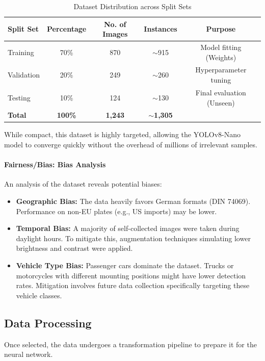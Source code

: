\begin{table}[htbp]
	\centering
	\caption{Dataset Distribution across Split Sets}
	\label{tab:dataset_split}
	\begin{tabular}{@{}lcccc@{}}
		\toprule
		\textbf{Split Set} & \textbf{Percentage} & \textbf{No. of Images} & \textbf{Instances} & \textbf{Purpose} \\ \midrule
		Training & 70\% & 870 & $\sim$915 & Model fitting (Weights) \\
		Validation & 20\% & 249 & $\sim$260 & Hyperparameter tuning \\
		Testing & 10\% & 124 & $\sim$130 & Final evaluation (Unseen) \\ \midrule
		\textbf{Total} & \textbf{100\%} & \textbf{1,243} & \textbf{$\sim$1,305} & \\ \bottomrule
	\end{tabular}
\end{table}

While compact, this dataset is highly targeted, allowing the YOLOv8-Nano model to converge quickly without the overhead of millions of irrelevant samples.

\paragraph{Fairness/Bias: Bias Analysis}
An analysis of the dataset reveals potential biases:
\begin{itemize}
	\item \textbf{Geographic Bias:} The data heavily favors German formats (DIN 74069). Performance on non-EU plates (e.g., US imports) may be lower.
	\item \textbf{Temporal Bias:} A majority of self-collected images were taken during daylight hours. To mitigate this, augmentation techniques simulating lower brightness and contrast were applied.
	\item \textbf{Vehicle Type Bias:} Passenger cars dominate the dataset. Trucks or motorcycles with different mounting positions might have lower detection rates. Mitigation involves future data collection specifically targeting these vehicle classes.
\end{itemize}

\subsection{Data Processing}
\label{subsec:data_processing}

Once selected, the data undergoes a transformation pipeline to prepare it for the neural network.

